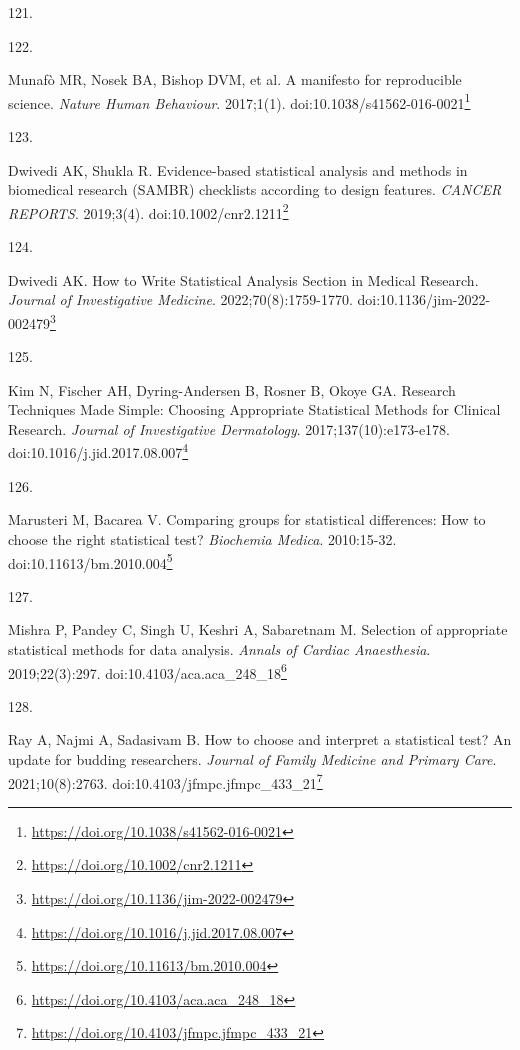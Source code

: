 \documentclass[
  a4paper,
]{book}
\newlength{\cslhangindent}
\newlength{\csllabelwidth}
\newlength{\cslentryspacingunit} %
\newenvironment{CSLReferences}[2] %
 {%
  \setlength{\parindent}{0pt}
  \ifodd #1
  \let\oldpar\par
  \def\par{\hangindent=\cslhangindent\oldpar}
  \fi
  \setlength{\parskip}{#2\cslentryspacingunit}
 }%
 {}
\newcommand{\CSLLeftMargin}[1]{\parbox[t]{\csllabelwidth}{#1}}
\newcommand{\CSLRightInline}[1]{\parbox[t]{\linewidth - \csllabelwidth}{#1}\break}
\renewcommand{\href}[2]{#2\footnote{\url{#1}}}
\begin{document}
\begin{CSLReferences}{0}{0}
\leavevmode{}%
\CSLLeftMargin{121. }

\leavevmode{}%
\CSLLeftMargin{122. }%
\CSLRightInline{Munafò MR, Nosek BA, Bishop DVM, et al. A manifesto for reproducible science. \emph{Nature Human Behaviour}. 2017;1(1). doi:\href{https://doi.org/10.1038/s41562-016-0021}{10.1038/s41562-016-0021}}

\leavevmode{}%
\CSLLeftMargin{123. }%
\CSLRightInline{Dwivedi AK, Shukla R. Evidence{-}based statistical analysis and methods in biomedical research (SAMBR) checklists according to design features. \emph{CANCER REPORTS}. 2019;3(4). doi:\href{https://doi.org/10.1002/cnr2.1211}{10.1002/cnr2.1211}}

\leavevmode{}%
\CSLLeftMargin{124. }%
\CSLRightInline{Dwivedi AK. How to Write Statistical Analysis Section in Medical Research. \emph{Journal of Investigative Medicine}. 2022;70(8):1759-1770. doi:\href{https://doi.org/10.1136/jim-2022-002479}{10.1136/jim-2022-002479}}

\leavevmode{}%
\CSLLeftMargin{125. }%
\CSLRightInline{Kim N, Fischer AH, Dyring-Andersen B, Rosner B, Okoye GA. Research Techniques Made Simple: Choosing Appropriate Statistical Methods for Clinical Research. \emph{Journal of Investigative Dermatology}. 2017;137(10):e173-e178. doi:\href{https://doi.org/10.1016/j.jid.2017.08.007}{10.1016/j.jid.2017.08.007}}

\leavevmode{}%
\CSLLeftMargin{126. }%
\CSLRightInline{Marusteri M, Bacarea V. Comparing groups for statistical differences: How to choose the right statistical test? \emph{Biochemia Medica}. 2010:15-32. doi:\href{https://doi.org/10.11613/bm.2010.004}{10.11613/bm.2010.004}}

\leavevmode{}%
\CSLLeftMargin{127. }%
\CSLRightInline{Mishra P, Pandey C, Singh U, Keshri A, Sabaretnam M. Selection of appropriate statistical methods for data analysis. \emph{Annals of Cardiac Anaesthesia}. 2019;22(3):297. doi:\href{https://doi.org/10.4103/aca.aca_248_18}{10.4103/aca.aca\_248\_18}}

\leavevmode{}%
\CSLLeftMargin{128. }%
\CSLRightInline{Ray A, Najmi A, Sadasivam B. How to choose and interpret a statistical test? An update for budding researchers. \emph{Journal of Family Medicine and Primary Care}. 2021;10(8):2763. doi:\href{https://doi.org/10.4103/jfmpc.jfmpc_433_21}{10.4103/jfmpc.jfmpc\_433\_21}}


\end{CSLReferences}
\end{document}
